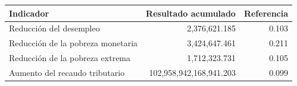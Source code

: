 \begin{tabular}{lrr}
\toprule
Indicador & Resultado acumulado & Referencia \\
\midrule
Reducción del desempleo & 2,376,621.185 & 0.103 \\
Reducción de la pobreza monetaria & 3,424,647.461 & 0.211 \\
Reducción de la pobreza extrema & 1,712,323.731 & 0.105 \\
Aumento del recaudo tributario & 102,958,942,168,941.203 & 0.099 \\
\bottomrule
\end{tabular}

